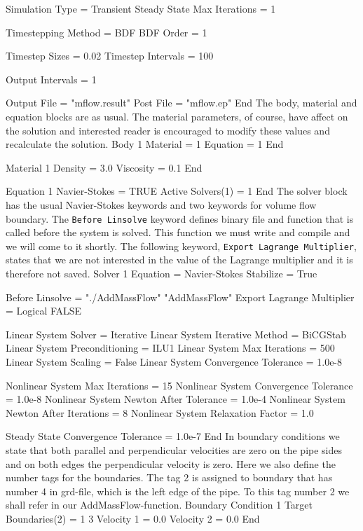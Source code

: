   Simulation Type = Transient
  Steady State Max Iterations = 1

  Timestepping Method = BDF
  BDF Order = 1

  Timestep Sizes = 0.02
  Timestep Intervals = 100

  Output Intervals = 1

  Output File = "mflow.result"
  Post File = "mflow.ep"
End
\ttend
The body, material and equation blocks are as usual. The material parameters,
of course, have affect on the solution and interested reader is encouraged to
modify these values and recalculate the solution.
\ttbegin
Body 1
  Material = 1
  Equation = 1
End

Material 1
  Density = 3.0
  Viscosity = 0.1
End

Equation 1
  Navier-Stokes = TRUE
  Active Solvers(1) = 1
End
\ttend
The solver block has the usual Navier-Stokes keywords and two keywords
for volume flow boundary. 
The {\tt Before Linsolve} keyword defines binary file and function that is
called before the system is solved. This function we must write and
compile and we will come to it shortly. The following keyword,
{\tt Export Lagrange Multiplier}, states that we are not interested in 
the value of the Lagrange multiplier and it is therefore not saved.
\ttbegin
Solver 1
  Equation = Navier-Stokes
  Stabilize = True

  Before Linsolve = "./AddMassFlow" "AddMassFlow"
  Export Lagrange Multiplier = Logical FALSE

  Linear System Solver = Iterative
  Linear System Iterative Method = BiCGStab
  Linear System Preconditioning = ILU1
  Linear System Max Iterations = 500
  Linear System Scaling = False
  Linear System Convergence Tolerance = 1.0e-8

  Nonlinear System Max Iterations = 15
  Nonlinear System Convergence Tolerance = 1.0e-8
  Nonlinear System Newton After Tolerance = 1.0e-4
  Nonlinear System Newton After Iterations = 8
  Nonlinear System Relaxation Factor = 1.0

  Steady State Convergence Tolerance = 1.0e-7
End
\ttend
In boundary conditions we state that both parallel and perpendicular velocities
are zero on the pipe sides and on both edges the perpendicular velocity is zero.
Here we also define the number tags for the boundaries. The tag 2 is assigned to
boundary that has number 4 in grd-file, which is the left edge of the pipe.
To this tag number 2 we shall refer in our AddMassFlow-function.
\ttbegin
Boundary Condition 1
  Target Boundaries(2) = 1 3
  Velocity 1 = 0.0
  Velocity 2 = 0.0
End

